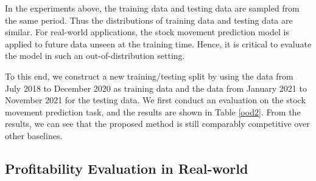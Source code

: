 \documentclass{article}
\begin{document}
In the experiments above, the training data and testing data are sampled from the same period. Thus the distributions of training data and testing data are similar. For real-world applications, the stock movement prediction model is applied to future data unseen at the training time. Hence, it is critical to evaluate the model in such an out-of-distribution setting. 
\begin{table}[H]
\centering
\caption{The comparison (\%) of the out-of-distribution evaluation on stock movement classification with StockNet, RoBERTa-WWM Ext, HAN Stock method and our method from 1/1/2021 to 12/11/2021.}
\label{ood2}
\end{table}
To this end, we construct a new training/testing split by using the data from July 2018 to December 2020 as training data and the data from January 2021 to November 2021 for the testing data. We first conduct an evaluation on the stock movement prediction task, and the results are shown in Table  \ref{ood2}. From the results, we can see that the proposed method is still comparably competitive over other baselines. 








\subsection{Profitability Evaluation in Real-world}
\end{document}
